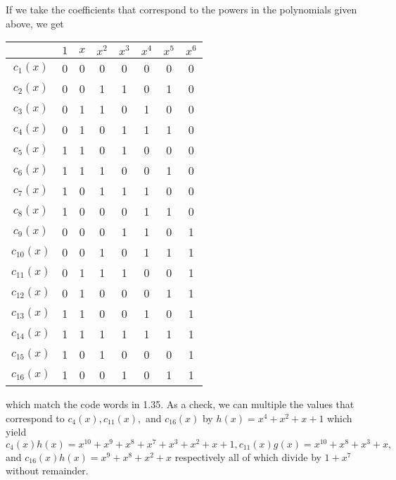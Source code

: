 \documentclass{article}
\begin{document}
If we take the coefficients that correspond to the powers in the polynomials given above, we get \\
\begin{center}
\begin{tabular}{c | c c c c c c c}
            & $1$ & $x$ & $x^2$ & $x^3$ & $x^4$ & $x^5$ & $x^6$  \\ \hline 
$c_1(x)$    & 0   & 0   & 0     & 0     & 0     & 0     & 0      \\
$c_2(x)$    & 0   & 0   & 1     & 1     & 0     & 1     & 0      \\
$c_3(x)$    & 0   & 1   & 1     & 0     & 1     & 0     & 0      \\
$c_4(x)$    & 0   & 1   & 0     & 1     & 1     & 1     & 0      \\
$c_5(x)$    & 1   & 1   & 0     & 1     & 0     & 0     & 0      \\
$c_6(x)$    & 1   & 1   & 1     & 0     & 0     & 1     & 0      \\
$c_7(x)$    & 1   & 0   & 1     & 1     & 1     & 0     & 0      \\
$c_8(x)$    & 1   & 0   & 0     & 0     & 1     & 1     & 0      \\
$c_9(x)$    & 0   & 0   & 0     & 1     & 1     & 0     & 1      \\
$c_{10}(x)$ & 0   & 0   & 1     & 0     & 1     & 1     & 1      \\
$c_{11}(x)$ & 0   & 1   & 1     & 1     & 0     & 0     & 1      \\
$c_{12}(x)$ & 0   & 1   & 0     & 0     & 0     & 1     & 1      \\
$c_{13}(x)$ & 1   & 1   & 0     & 0     & 1     & 0     & 1      \\
$c_{14}(x)$ & 1   & 1   & 1     & 1     & 1     & 1     & 1      \\
$c_{15}(x)$ & 1   & 0   & 1     & 0     & 0     & 0     & 1      \\
$c_{16}(x)$ & 1   & 0   & 0     & 1     & 0     & 1     & 1      \\ 
\end{tabular}
\end{center}
which match the code words in 1.35. As a check, we can multiple the values that correspond to $c_4(x), c_{11}(x), $ and $c_{16}(x)$ by $h(x) = x^4 + x^2 + x + 1$ which yield $c_4(x)h(x) = x^10 + x^9 + x^8 + x^7 + x^3 + x^2 + x + 1, c_{11}(x)g(x) = x^10 + x^8 + x^3 + x,$ and $c_{16}(x)h(x) = x^9 + x^8 + x^2 + x$ respectively all of which divide by $1 + x^7$ without remainder.
\end{document}

